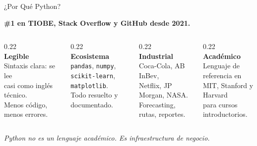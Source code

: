\documentclass[aspectratio=169, 11pt]{beamer}
\begin{document}
\begin{frame}{¿Por Qué Python?}
  \vspace{-2pt}
  \centering

  {\small\color{arcaDark}\bfseries
    \#1 en TIOBE, Stack Overflow y GitHub desde 2021.}

  \vspace{10pt}
  \begin{columns}[T]
    \begin{column}{0.22\textwidth}
      \centering
      {\Huge\color{arcaRed}\faChartLine}\\[6pt]
      {\small\bfseries\color{arcaDark} Legible}\\[3pt]
      {\scriptsize\color{textMuted} Sintaxis clara: se lee\\
      casi como inglés técnico.\\
      Menos código, menos errores.}
    \end{column}

    \begin{column}{0.22\textwidth}
      \centering
      {\Huge\color{arcaRed}\faCubes}\\[6pt]
      {\small\bfseries\color{arcaDark} Ecosistema}\\[3pt]
      {\scriptsize\color{textMuted} \texttt{pandas}, \texttt{numpy},\\
      \texttt{scikit-learn}, \texttt{matplotlib}.\\
      Todo resuelto y documentado.}
    \end{column}

    \begin{column}{0.22\textwidth}
      \centering
      {\Huge\color{arcaRed}\faIndustry}\\[6pt]
      {\small\bfseries\color{arcaDark} Industrial}\\[3pt]
      {\scriptsize\color{textMuted} Coca-Cola, AB InBev,\\
      Netflix, JP Morgan, NASA.\\
      Forecasting, rutas, reportes.}
    \end{column}

    \begin{column}{0.22\textwidth}
      \centering
      {\Huge\color{arcaRed}\faGraduationCap}\\[6pt]
      {\small\bfseries\color{arcaDark} Académico}\\[3pt]
      {\scriptsize\color{textMuted} Lenguaje de referencia en\\
      MIT, Stanford y Harvard\\
      para cursos introductorios.}
    \end{column}
  \end{columns}

  \vspace{12pt}
  {\footnotesize\color{arcaDark}\itshape
    Python no es un lenguaje académico. Es infraestructura de negocio.}
\end{frame}
\end{document}
